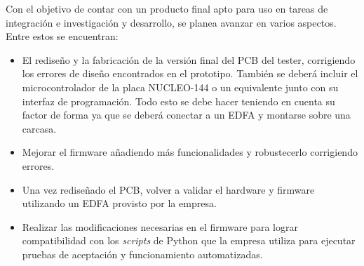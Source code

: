 Con el objetivo de contar con un producto final apto para uso en tareas de integración e investigación y desarrollo, se planea avanzar en varios aspectos. Entre estos se encuentran:

\begin{itemize}
\item El rediseño y la fabricación de la versión final del PCB del tester, corrigiendo los errores de diseño encontrados en el prototipo. También se deberá incluir el microcontrolador de la placa NUCLEO-144 o un equivalente junto con su interfaz de programación. Todo esto se debe hacer teniendo en cuenta su factor de forma ya que se deberá conectar a un EDFA y montarse sobre una carcasa. 
\item Mejorar el firmware añadiendo más funcionalidades y robustecerlo corrigiendo errores.
\item Una vez rediseñado el PCB, volver a validar el hardware y firmware utilizando un EDFA provisto por la empresa.
\item Realizar las modificaciones necesarias en el firmware para lograr compatibilidad con los \textit{scripts} de Python que la empresa utiliza para ejecutar pruebas de aceptación y funcionamiento automatizadas.
\end{itemize}